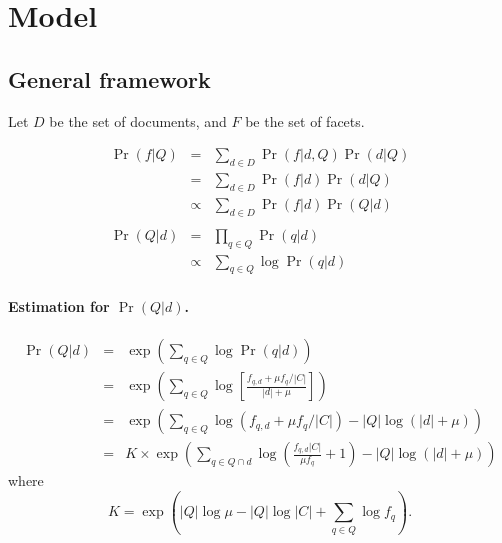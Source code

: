 \section{Model}


\subsection{General framework}  

Let $D$ be the set of documents, and $F$ be the set of facets.

\begin{eqnarray}
  \Pr(f|Q) &=& \sum_{d \in D} \Pr(f|d,Q) \Pr(d|Q) \nonumber\\
  &=& \sum_{d \in D} \Pr(f|d) \Pr(d|Q) \nonumber\\
  &\propto& \sum_{d \in D} \Pr(f|d) \Pr(Q|d) \label{eq:pr(f|Q)}\\
  && \nonumber\\
  \Pr(Q|d) &=& \prod_{q \in Q} \Pr(q|d) \nonumber\\
  &\propto& \sum_{q \in Q} \log \Pr(q|d) \label{eq:pr(Q|d)}
\end{eqnarray}

\paragraph{Estimation for $\Pr(Q|d)$.}

\begin{eqnarray}
  \Pr(Q|d) &=& \exp \left(\sum_{q \in Q} \log \Pr(q|d) \right) \nonumber\\
  &=& \exp \left(\sum_{q \in Q} \log \left[ \frac{f_{q,d} + \mu f_q / |C|}{|d| + \mu} \right] \right) \nonumber\\
  &=& \exp \left(\sum_{q \in Q} \log \left( f_{q,d} + \mu f_q / |C| \right) - |Q| \log \left( |d| + \mu \right) \right) \nonumber\\
  &=& K \times \exp \left( \sum_{q \in Q \cap d} \log \left( \frac{f_{q,d} |C|}{\mu f_q} + 1 \right) 
  - |Q| \log \left( |d| + \mu \right) \right) 
\end{eqnarray}
where \[ K = \exp \left( |Q| \log \mu - |Q| \log |C| + \sum_{q \in Q} \log f_q \right). \]

